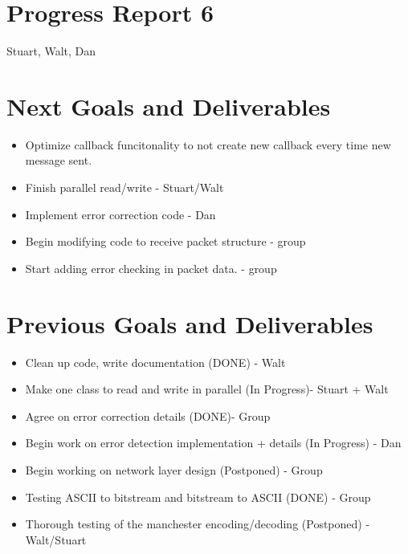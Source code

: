 \documentclass{article}
\begin{document}
\section*{Progress Report 6}
Stuart, Walt, Dan

\section*{Next Goals and Deliverables}
\begin{itemize}
    \item Optimize callback funcitonality to not create new callback every time new message sent.

    \item Finish parallel read/write - Stuart/Walt
    \item Implement error correction code - Dan
    \item Begin modifying code to receive packet structure - group
    \item Start adding error checking in packet data. - group
\end{itemize}

\section*{Previous Goals and Deliverables}
\begin{itemize}
    \item Clean up code, write documentation (DONE) - Walt
    \item Make one class to read and write in parallel (In Progress)- Stuart + Walt
    \item Agree on error correction details (DONE)- Group
    \item Begin work on error detection implementation + details (In Progress) - Dan
    \item Begin working on network layer design (Postponed) - Group
    \item Testing ASCII to bitstream and bitstream to ASCII (DONE) - Group
    \item Thorough testing of the manchester encoding/decoding (Postponed) - Walt/Stuart
\end{itemize}
\end{document}
